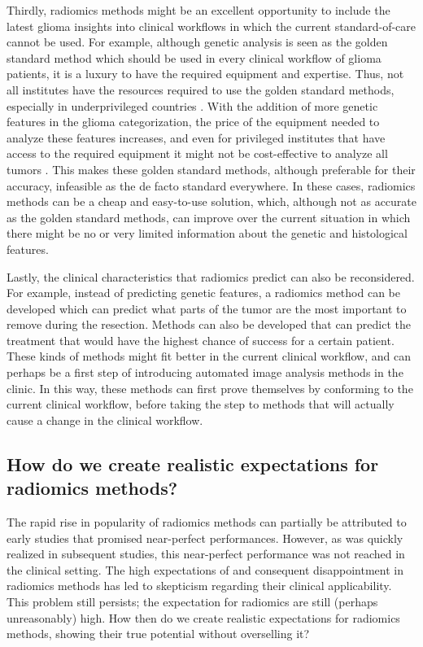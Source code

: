 Thirdly, radiomics methods might be an excellent opportunity to include  the latest glioma insights into clinical workflows in which the current standard-of-care cannot be used.
For example, although genetic analysis is seen as the golden standard method which should be used in every clinical workflow of glioma patients, it is a luxury to have the required equipment and expertise.
Thus, not all institutes have the resources required to use the golden standard methods, especially in underprivileged countries \autocite{santosh2019india}.
With the addition of more genetic features in the glioma categorization, the price of the equipment needed to analyze these features  increases, and even for privileged institutes that have access to the required equipment it might not be cost-effective to analyze all \glspl{tumor} \autocite{malzkorn2016practical,dewitt2017costIDH}.
This makes these golden standard methods, although preferable for their accuracy, infeasible as the de facto standard everywhere.
In these cases, radiomics methods can be a cheap and easy-to-use solution, which, although not as accurate as the golden standard methods, can improve over the current situation in which there might be no or very limited information about the genetic and histological features.

Lastly, the clinical characteristics that radiomics predict can also be reconsidered.
For example, instead of predicting genetic features, a radiomics method can be developed which can predict what parts of the \gls{tumor} are the most important to remove during the resection.
Methods can also be developed that can predict the treatment that would have the highest chance of success for a certain patient.
These kinds of methods might fit better in the current clinical workflow, and can perhaps be a first step of introducing automated image analysis methods in the clinic.
In this way, these methods can first prove themselves by conforming to the current clinical workflow, before taking the step to methods that will actually cause a change in the clinical workflow.

\subsection{How do we create realistic expectations for radiomics methods?}

The rapid rise in popularity of radiomics methods can partially be attributed to early studies that promised near-perfect performances.
However, as was quickly realized in subsequent studies, this near-perfect performance was not reached in the clinical setting.
The high expectations of and consequent disappointment in  radiomics methods has led to skepticism regarding their clinical applicability.
This problem still persists; the expectation for radiomics are still (perhaps unreasonably) high.
How then do we create realistic expectations for radiomics methods, showing their true potential without overselling it?

